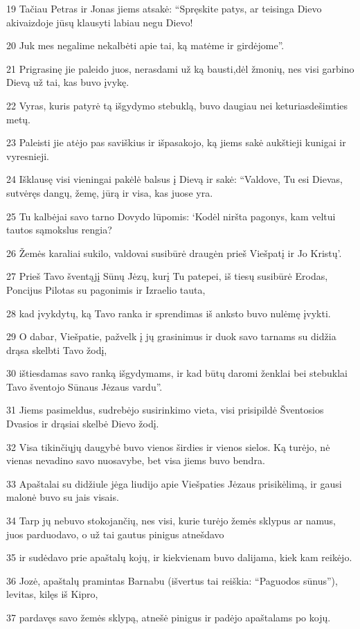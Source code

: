 \par 19 Tačiau Petras ir Jonas jiems atsakė: “Spręskite patys, ar teisinga Dievo akivaizdoje jūsų klausyti labiau negu Dievo! 
\par 20 Juk mes negalime nekalbėti apie tai, ką matėme ir girdėjome”. 
\par 21 Prigrasinę jie paleido juos, nerasdami už ką bausti,­dėl žmonių, nes visi garbino Dievą už tai, kas buvo įvykę. 
\par 22 Vyras, kuris patyrė tą išgydymo stebuklą, buvo daugiau nei keturiasdešimties metų. 
\par 23 Paleisti jie atėjo pas saviškius ir išpasakojo, ką jiems sakė aukštieji kunigai ir vyresnieji. 
\par 24 Išklausę visi vieningai pakėlė balsus į Dievą ir sakė: “Valdove, Tu esi Dievas, sutvėręs dangų, žemę, jūrą ir visa, kas juose yra. 
\par 25 Tu kalbėjai savo tarno Dovydo lūpomis: ‘Kodėl niršta pagonys, kam veltui tautos sąmokslus rengia? 
\par 26 Žemės karaliai sukilo, valdovai susibūrė draugėn prieš Viešpatį ir Jo Kristų’. 
\par 27 Prieš Tavo šventąjį Sūnų Jėzų, kurį Tu patepei, iš tiesų susibūrė Erodas, Poncijus Pilotas su pagonimis ir Izraelio tauta, 
\par 28 kad įvykdytų, ką Tavo ranka ir sprendimas iš anksto buvo nulėmę įvykti. 
\par 29 O dabar, Viešpatie, pažvelk į jų grasinimus ir duok savo tarnams su didžia drąsa skelbti Tavo žodį, 
\par 30 ištiesdamas savo ranką išgydymams, ir kad būtų daromi ženklai bei stebuklai Tavo šventojo Sūnaus Jėzaus vardu”. 
\par 31 Jiems pasimeldus, sudrebėjo susirinkimo vieta, visi prisipildė Šventosios Dvasios ir drąsiai skelbė Dievo žodį. 
\par 32 Visa tikinčiųjų daugybė buvo vienos širdies ir vienos sielos. Ką turėjo, nė vienas nevadino savo nuosavybe, bet visa jiems buvo bendra. 
\par 33 Apaštalai su didžiule jėga liudijo apie Viešpaties Jėzaus prisikėlimą, ir gausi malonė buvo su jais visais. 
\par 34 Tarp jų nebuvo stokojančių, nes visi, kurie turėjo žemės sklypus ar namus, juos parduodavo, o už tai gautus pinigus atnešdavo 
\par 35 ir sudėdavo prie apaštalų kojų, ir kiekvienam buvo dalijama, kiek kam reikėjo. 
\par 36 Jozė, apaštalų pramintas Barnabu (išvertus tai reiškia: “Paguodos sūnus”), levitas, kilęs iš Kipro, 
\par 37 pardavęs savo žemės sklypą, atnešė pinigus ir padėjo apaštalams po kojų.


